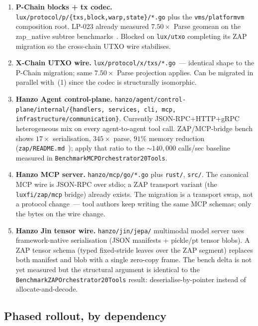\begin{enumerate}[leftmargin=*]
  \item \textbf{P-Chain blocks + tx codec.}
    \texttt{lux/protocol/p/\{txs,block,warp,state\}/*.go} plus the
    \texttt{vms/platformvm} composition root. LP-023 already measured
    $7.50\times$ Parse geomean on the zap\_native subtree
    benchmarks~\cite{lp023zapnative}. Blocked on \texttt{lux/utxo}
    completing its ZAP migration so the cross-chain UTXO wire
    stabilises.
  \item \textbf{X-Chain UTXO wire.}
    \texttt{lux/protocol/x/txs/*.go}~--- identical shape to the
    P-Chain migration; same $7.50\times$ Parse projection applies. Can
    be migrated in parallel with~(1) since the codec is structurally
    isomorphic.
  \item \textbf{Hanzo Agent control-plane.}
    \texttt{hanzo/agent/control-plane/internal/\{handlers, services,
    cli, mcp, infrastructure/communication\}}. Currently
    JSON-RPC$+$HTTP$+$gRPC heterogeneous mix on every agent-to-agent
    tool call. ZAP/MCP-bridge bench shows $17\times$ serialisation,
    $345\times$ parse, $91\%$ memory reduction
    (\texttt{zap/README.md}~\cite{zapreadme}); apply that ratio to the
    $\sim$$140{,}000$ calls/sec baseline measured in
    \texttt{BenchmarkMCPOrchestrator20Tools}.
  \item \textbf{Hanzo MCP server.}
    \texttt{hanzo/mcp/go/*.go} plus \texttt{rust/}, \texttt{src/}. The
    canonical MCP wire is JSON-RPC over stdio; a ZAP transport variant
    (the \texttt{luxfi/zap/mcp} bridge) already exists. The migration
    is a transport swap, not a protocol change~--- tool authors keep
    writing the same MCP schemas; only the bytes on the wire change.
  \item \textbf{Hanzo Jin tensor wire.}
    \texttt{hanzo/jin/jepa/} multimodal model server uses
    framework-native serialisation (JSON manifests + pickle/pt tensor
    blobs). A ZAP tensor schema (typed fixed-stride leaves over the
    ZAP segment) replaces both manifest and blob with a single
    zero-copy frame. The bench delta is not yet measured but the
    structural argument is identical to the
    \texttt{BenchmarkZAPOrchestrator20Tools} result:
    deserialise-by-pointer instead of allocate-and-decode.
\end{enumerate}

\subsection{Phased rollout, by dependency}


